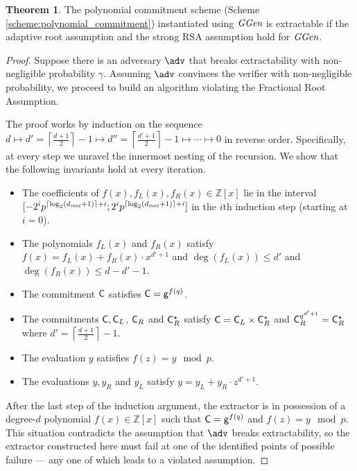 \documentclass{article}
\theoremstyle{definition}
\newtheorem{theorem}{Theorem}
\newcommand{\alan}[1]{{\todo[color=blue!40!white]{Alan: #1}}}
\newcommand{\alan}[1]{}
\begin{document}
\begin{theorem}
	The polynomial commitment scheme (Scheme \ref{scheme:polynomial_commitment}) instantiated using $\textit{GGen}$ is extractable if the adaptive root assumption and the strong RSA assumption hold for $\textit{GGen}$.
\end{theorem}
\begin{proof}
Suppose there is an adversary $\adv$ that breaks extractability with non-negligible probability $\gamma$. Assuming $\adv$ convinces the verifier with non-negligible probability, we proceed to build an algorithm violating the Fractional Root Assumption.

The proof works by induction on the sequence $d \mapsto d' = \left\lceil \frac{d+1}{2} \right\rceil - 1 \mapsto d'' = \left\lceil \frac{d'+1}{2} \right\rceil - 1 \mapsto \cdots \mapsto 0$ in reverse order. Specifically, at every step we unravel the innermost nesting of the recursion. We show that the following invariants hold at every iteration.
\begin{itemize}
    \itemsep0pt
    \item The coefficients of $f(x), f_L(x), f_R(x) \in \mathbb{Z}[x]$ lie in the interval $[-2^ip^{\lceil \log_2(d_{\it max} + 1) \rceil+i}; 2^ip^{\lceil \log_2(d_{\it max} + 1) \rceil+i}]$ in the $i$th induction step (starting at $i=0$).
    \item The polynomials $f_L(x)$ and $f_R(x)$ satisfy $f(x) = f_L(x) + f_R(x) \cdot x^{d'+1}$ and $\deg(f_L(x)) \leq d'$ and $\deg(f_R(x)) \leq d - d' - 1$.
    \item The commitment $\mathsf{C}$ satisfies $\mathsf{C} = \mathsf{g}^{f(q)}$.
    \item The commitments $\mathsf{C}, \mathsf{C}_L$, $\mathsf{C}_R$ and $\mathsf{C}_R^\star$ satisfy $\mathsf{C} = \mathsf{C}_L \times \mathsf{C}_R^\star$ and $\mathsf{C}_R^{q^{d'+1}} = \mathsf{C}_R^\star$ where $d' = \left\lceil \frac{d+1}{2} \right\rceil - 1$.
    \item The evaluation $y$ satisfies $f(z) = y \mod p$.
    \item The evaluations $y, y_R$ and $y_L$ satisfy $y = y_L + y_R \cdot z^{d'+1}$.
\end{itemize}

After the last step of the induction argument, the extractor is in possession of a degree-$d$ polynomial $f(x) \in \mathbb{Z}[x]$ such that $\mathsf{C} = \mathsf{g}^{f(q)}$ and $f(z) = y \mod p$. This situation contradicts the assumption that $\adv$ breaks extractability, so the extractor constructed here must fail at one of the identified points of possible failure --- any one of which leads to a violated assumption.


\end{proof}
\end{document}
